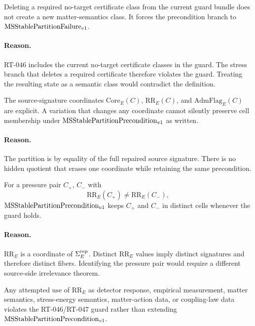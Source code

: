 \begin{proposition}
Deleting a required no-target certificate class from the current guard bundle
does not create a new matter-semantics class. It forces the precondition
branch to \(\mathrm{MSStablePartitionFailure}_{v1}\).
\end{proposition}

\paragraph{Reason.}
RT-046 includes the current no-target certificate classes in the guard. The
stress branch that deletes a required certificate therefore violates the
guard. Treating the resulting state as a semantic class would contradict the
definition.

\begin{proposition}
The source-signature coordinates \(\mathrm{Core}_E(C)\),
\(\mathrm{RR}_E(C)\), and \(\mathrm{AdmFlag}_E(C)\) are explicit. A variation
that changes any coordinate cannot silently preserve cell membership under
\(\mathrm{MSStablePartitionPrecondition}_{v1}\) as written.
\end{proposition}

\paragraph{Reason.}
The partition is by equality of the full repaired source signature. There is
no hidden quotient that erases one coordinate while retaining the same
precondition.

\begin{proposition}
For a pressure pair \(C_+\), \(C_-\) with
\[
  \mathrm{RR}_E(C_+)\neq\mathrm{RR}_E(C_-),
\]
\(\mathrm{MSStablePartitionPrecondition}_{v1}\) keeps \(C_+\) and \(C_-\) in distinct cells whenever the
guard holds.
\end{proposition}

\paragraph{Reason.}
\(\mathrm{RR}_E\) is a coordinate of \(\Sigma^{\mathrm{rep}}_E\). Distinct
\(\mathrm{RR}_E\) values imply distinct signatures and therefore distinct
fibers. Identifying the pressure pair would require a different source-side
irrelevance theorem.

\begin{proposition}
Any attempted use of \(\mathrm{RR}_E\) as detector response, empirical
measurement, matter semantics, stress-energy semantics, matter-action data,
or coupling-law data violates the RT-046/RT-047 guard rather than extending
\(\mathrm{MSStablePartitionPrecondition}_{v1}\).
\end{proposition}


